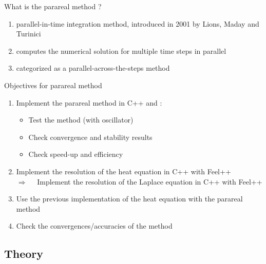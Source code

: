 \begin{frame}{What is the parareal method ?}
	
	\begin{enumerate}[\textbullet]
		\item parallel-in-time integration method, introduced in 2001 by Lions, Maday and Turinici~\cite{partie2_ref1}
		\item computes the numerical solution for multiple time steps in parallel
		\item categorized as a parallel-across-the-steps method 
	\end{enumerate}

\end{frame}

\begin{frame}{Objectives for parareal method}
	
	\begin{enumerate}[\textbullet]
		\item Implement the parareal method in C++ and :
		\begin{itemize}
			\item Test the method (with oscillator)
			\item Check convergence and stability results
			\item Check speed-up and efficiency 
		\end{itemize}
		\item Implement the resolution of the heat equation in C++ with Feel++ \\
		$\Rightarrow \quad $ Implement the resolution of the Laplace equation in C++ with Feel++ \\
		\item Use the previous implementation of the heat equation with the parareal method
		\item Check the convergences/accuracies of the method
	\end{enumerate}
	
\end{frame}


\subsection{Theory}

